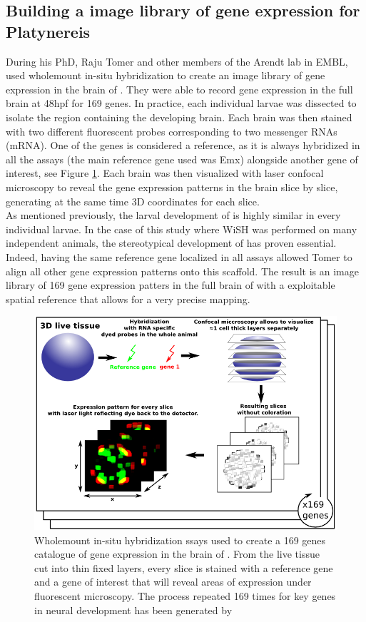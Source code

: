      \subsection{Building a image library of gene expression for Platynereis}
     During his PhD, Raju Tomer and other members of the Arendt lab in EMBL, used wholemount in-situ hybridization to create an image library of gene expression in the brain of \platy{}. They were able to record gene expression in the full brain at 48hpf for 169 genes. In practice, each individual larvae was dissected to isolate the region containing the developing brain. Each brain was then stained with two different fluorescent probes corresponding to two messenger RNAs (mRNA). One of the genes is considered a reference, as it is always hybridized in all the assays (the main reference gene used was Emx) alongside another gene of interest, see Figure \ref{fig:insitu}. Each brain was then visualized with laser confocal microscopy to reveal the gene expression patterns in the brain slice by slice, generating at the same time 3D coordinates for each slice.\\
     
     As mentioned previously, the larval development of \platy{} is highly similar in every individual larvae. In the case of this study where WiSH was performed on many independent animals, the stereotypical development of \platy{} has proven essential. Indeed, having the same reference gene localized in all assays allowed Tomer to align all other gene expression patterns onto this scaffold. The result is an image library of 169 gene expression patters in the full brain of \platy{} with a exploitable spatial reference that allows for a very precise mapping.\\
    
    \begin{figure}[bth]
\centerline{\includegraphics[width=0.9\linewidth]{gfx/chapter1/insitu.png}}
\caption{Wholemount in-situ hybridization ssays used to create a 169 genes catalogue of gene expression in the brain of \platy{}. From the live tissue cut into thin fixed layers, every slice is stained with a reference gene and a gene of interest that will reveal areas of expression under fluorescent microscopy. The process repeated 169 times for key genes in \platy{} neural development has been generated by \cite{Tomer10}}\label{fig:insitu}
	\end{figure}
	
